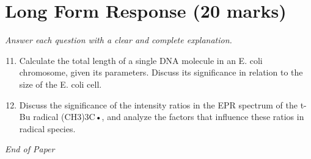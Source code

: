 \documentclass[12pt]{article}
\begin{document}
\section*{Long Form Response (20 marks)}
\textit{Answer each question with a clear and complete explanation.}
\begin{enumerate}[label=\arabic*.]
\setcounter{enumi}{10}
\item Calculate the total length of a single DNA molecule in an E. coli chromosome, given its
parameters. Discuss its significance in relation to the size of the E. coli cell.
\item Discuss the significance of the intensity ratios in the EPR spectrum of the t-Bu radical
(CH3)3C•, and analyze the factors that influence these ratios in radical species.
\end{enumerate}

\vfill
\noindent\textit{End of Paper}
\end{document}
